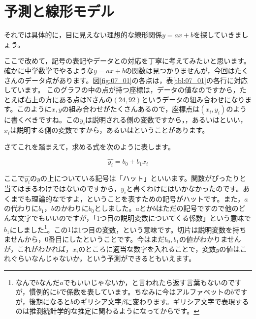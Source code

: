 \documentclass{ltjbook}
\begin{document}
\section{予測と線形モデル}

それでは具体的に，目に見えない理想的な線形関係$y=ax+b$を探していきましょう。

ここで改めて，記号の表記やデータとの対応を丁寧に考えてみたいと思います。確かに中学数学でやるような$y=ax+b$の関数は見つかりませんが，今回はたくさんのデータ点があります。図\ref{fig:07_01}の各点は，表\ref{tbl:07_01}の各行に対応しています。
このグラフの中の点が持つ座標は，データの値なのですから，たとえば右上の方にある点はNさんの$(24,92)$というデータの組み合わせになります。このように$x,y$の組み合わせがたくさんあるので，座標点は$(x_i,y_i)$のように書くべきですね。この$y_i$は説明される側の変数ですから，，あるいはといい，$x_i$は説明する側の変数ですから，あるいはということがあります。

さてこれを踏まえて，求める式を次のように表します。

\[ \hat{y_i} = b_0 + b_1 x_i \]

ここで$\hat{y_i}$の$y$の上についている記号は「ハット」といいます。関数がぴったりと当てはまるわけではないのですから，$y_i$と書くわけにはいかなかったのです。あくまでも理論的なですよ，ということを表すための記号がハットです。また，$a$の代わりに$b_1$，$b$のかわりに$b_0$としました。$a$とか$b$はただの記号ですので他のどんな文字でもいいのですが，「1つ目の説明変数についてくる係数」という意味で$b_1$にしました\footnote{なんで$b$なんだ$a$でもいいじゃないか，と言われたら返す言葉もないのですが，慣例的に$b$で係数を表しています。ちなみに今はアルファベットの$b$ですが，後期になると$b$のギリシア文字$\beta$に変わります。ギリシア文字で表現するのは推測統計学的な推定に関わるようになってからです。}。この$1$は1つ目の変数，という意味です。切片は説明変数を持ちませんから，0番目にしたということです。今はまだ$b_0, b_1$の値がわかりませんが，これがわかれば，$x_i$のところに適当な数字を入れることで，変数$y$の値はこれぐらいなんじゃないか，という予測ができるともいえます。
\end{document}
